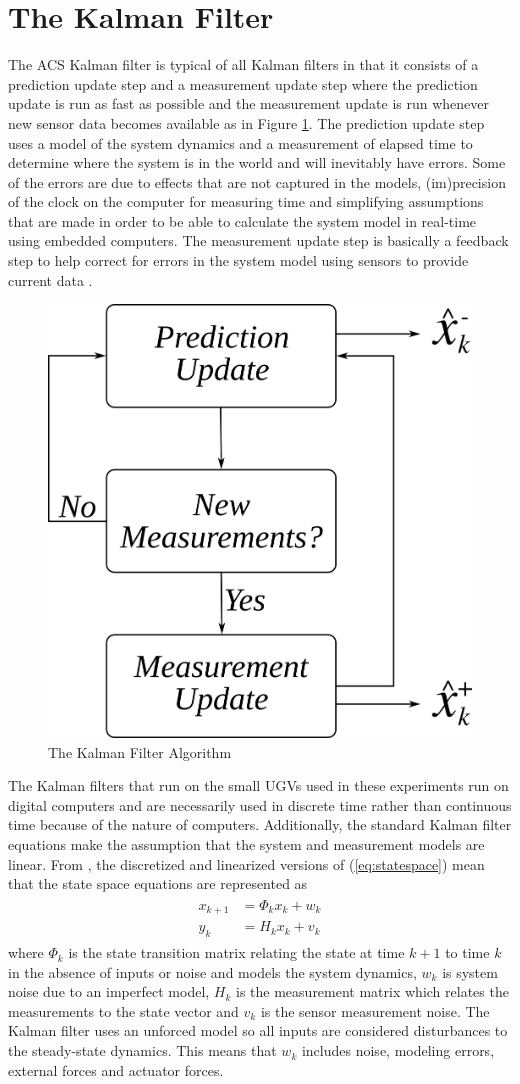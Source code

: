 \section{The Kalman Filter}
\label{sec:kalmanfilter}
The ACS Kalman filter is typical of all Kalman filters in that it consists of a prediction update step and a measurement update step where the prediction update is run as fast as possible and the measurement update is run whenever new sensor data becomes available as in Figure \ref{fig:kf}. The prediction update step uses a model of the system dynamics and a measurement of elapsed time to determine where the system is in the world and will inevitably have errors. Some of the errors are due to effects that are not captured in the models, (im)precision of the clock on the computer for measuring time and simplifying assumptions that are made in order to be able to calculate the system model in real-time using embedded computers. The measurement update step is basically a feedback step to help correct for errors in the system model using sensors to provide current data \cite{Kelly_1994_338}.

\begin{figure}[ht!]
	\centering
	\includegraphics[width=.4\textwidth]{images/kf}
	\caption{The Kalman Filter Algorithm}
	\label{fig:kf}
\end{figure}

The Kalman filters that run on the small UGVs used in these experiments run on digital computers and are necessarily used in discrete time rather than continuous time because of the nature of computers. Additionally, the standard Kalman filter equations make the assumption that the system and measurement models are linear. From \cite{Kelly_1994_338}, \cite{Simon06OptimalEstimation} the discretized and linearized versions of (\ref{eq:statespace}) mean that the state space equations are represented as
\begin{align*}
\begin{split}
x_{k+1} &= \Phi_kx_k + w_k \\
y_k &= H_kx_k + v_k
\end{split}
\end{align*}
where $\Phi_k$ is the state transition matrix relating the state at time $k+1$ to time $k$ in the absence of inputs or noise and models the system dynamics, $w_k$ is system noise due to an imperfect model, $H_k$ is the measurement matrix which relates the measurements to the state vector and $v_k$ is the sensor measurement noise. The Kalman filter uses an unforced model so all inputs are considered disturbances to the steady-state dynamics. This means that $w_k$ includes noise, modeling errors, external forces and actuator forces.


